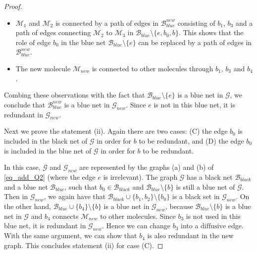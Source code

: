 \documentclass{article}
\newcommand{\1}{\mathds{1}}
\numberwithin{equation}{section}
\renewcommand{\cal}{\mathcal}
\newcommand{\dashed}{\text{diffusive}}
\theoremstyle{plain} %
\theoremstyle{remark}
\newcommand{\cM}{{\cal M}}
\begin{document}
\begin{proof}
\begin{itemize}
\item[(2)] $\cM_1$ and $\cM_2$ is connected by a path of edges in $\cal B^{new}_{blue}$ consisting of $b_1$, $b_3$ and a path of edges connecting $\cal M_2$ to $\cal M_3$ in $\cal B_{blue}\setminus \{e,b_0, b\}$. This shows that the role of edge $b_0$ in the blue net $\cal B_{blue} \setminus \{e\}$ can be replaced by a path of edges in $\cal B^{new}_{blue}$.
			
\item[(3)] The new molecule $\cal M_{new}$ is connected to other molecules through $b_1$, $b_3$ and $b_4$.
\end{itemize}
Combing these observations with the fact that $\cal B_{blue}\setminus \{e\}$ is a blue net in $\cal G$, we conclude that $\cal B^{new}_{blue}$ is a blue net in $\cal G_{new}$. Since $e$ is not in this blue net, it is redundant in $\cal G_{new}$.
		
\medskip
		
Next we prove the statement (ii). Again there are two cases: (C) the edge $b_0$ is included in the black net of $\cal G$ in order for $b$ to be redundant, and (D) the edge $b_0$ is included in the blue net of $\cal G$ in order for $b$ to be redundant. 

 
		
\vspace{5pt}
 In this case, $\cal G$ and $\cal G_{new}$ are represented by the graphs (a) and (b) of \eqref{eq_add_Q2} (where the edge $e$ is irrelevant). The graph $\cal G$ has a black net $\cal B_{black}$ and a blue net $\cal B_{blue}$, such that $b_0\in \cal B_{black}$ and $\cal B_{blue} \setminus \{b\}$ is still a blue net of $\cal G$. Then in $\cal G_{new}$, 
we again have that $\cal B_{black} \cup\{b_1,b_2\}\setminus \{b_0\}$ is a black set in $\cal G_{new}$. On the other hand, $\cal B_{blue} \cup \{b_4\}\setminus \{b\}$ is a blue net in $\cal G_{new}$, because $\cal B_{blue} \setminus \{b\}$ is a blue net in $\cal G$ and $b_4$ connects $\cal M_{new}$ to other  molecules.  Since $b_3$ is not used in this blue net, it is redundant in $\cal G_{new}$. Hence we can change $b_3$ into a $\dashed$ edge. With the same argument, we can show that $b_4$ is also redundant in the new graph. This concludes statement (ii) for case (C).



\end{proof}
\end{document}
